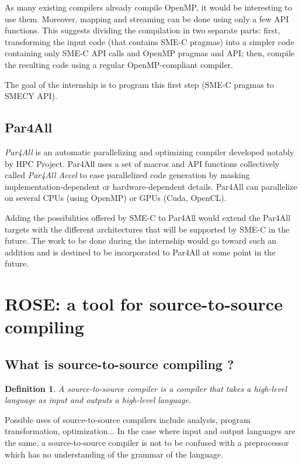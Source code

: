 \documentclass[a4paper]{article}
\newtheorem{defdef}{Definition}
\begin{document}
	As many existing compilers already compile OpenMP, it would be interesting to use them. Moreover, mapping and streaming can be done using only a few API functions. This suggests dividing the compilation in two separate parts: first, transforming the input code (that contains SME-C pragmas) into a simpler code containing only SME-C API calls and OpenMP pragmas and API; then, compile the resulting code using a regular OpenMP-compliant compiler.

	The goal of the internship is to program this first step (SME-C pragmas to SMECY API).
	
	\subsection{Par4All}
	\emph{Par4All} is an automatic parallelizing and optimizing compiler developed notably by HPC Project. Par4All uses a set of macros and API functions collectively called \emph{Par4All Accel} to ease parallelized code generation by masking implementation-dependent or hardware-dependent details. Par4All can parallelize on several CPUs (using OpenMP) or GPUs (Cuda, OpenCL).
	
	Adding the possibilities offered by SME-C to Par4All would extend the Par4All targets with the different architectures that will be supported by SME-C in the future. The work to be done during the internship would go toward such an addition and is destined to be incorporated to Par4All at some point in the future.

\section{ROSE: a tool for source-to-source compiling}
	\subsection{What is source-to-source compiling ?}
	\begin{defdef}A \emph{source-to-source compiler} is a compiler that takes a high-level language as input and outputs a high-level language.
	\end{defdef}
	
	Possible uses of source-to-source compilers include analysis, program transformation, optimization... In the case where input and output languages are the same, a source-to-source compiler is not to be confused with a preprocessor which has no understanding of the grammar of the language.
	
\end{document}

